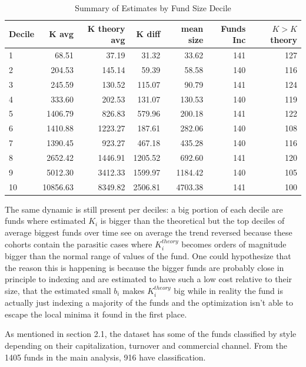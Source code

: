 \documentclass[12pt]{article}
\begin{document}
\begin{table}[H]
    \centering
    \caption{Summary of Estimates by Fund Size Decile}
    \label{tab:decile-estimates-new-3}
    \begin{tabular}{lrrrrrr}
        \hline
        Decile & K avg & K theory avg & K diff & mean size & Funds Inc & $K>K$ theory \\
        \hline
        1 & 68.51 & 37.19 & 31.32 & 33.62 & 141 & 127 \\
        2 & 204.53 & 145.14 & 59.39 & 58.58 & 140 & 116 \\
        3 & 245.59 & 130.52 & 115.07 & 90.79 & 141 & 124 \\
        4 & 333.60 & 202.53 & 131.07 & 130.53 & 140 & 119 \\
        5 & 1406.79 & 826.83 & 579.96 & 200.18 & 141 & 122 \\
        6 & 1410.88 & 1223.27 & 187.61 & 282.06 & 140 & 108 \\
        7 & 1390.45 & 923.27 & 467.18 & 435.28 & 140 & 116 \\
        8 & 2652.42 & 1446.91 & 1205.52 & 692.60 & 141 & 120 \\
        9 & 5012.30 & 3412.33 & 1599.97 & 1184.42 & 140 & 105 \\
        10 & 10856.63 & 8349.82 & 2506.81 & 4703.38 & 141 & 100 \\
        \hline
    \end{tabular}
\end{table}
The same dynamic is still present per deciles: a big portion of each decile are funds where estimated $K_i$ is bigger than the theoretical but the top deciles of average biggest funds over time see on average the trend reversed because these cohorts contain the parasitic cases where $K^{theory}_i$ becomes orders of magnitude bigger than the normal range of values of the fund.
One could hypothesize that the reason this is happening is because the bigger funds are probably close in principle to indexing and are estimated to have such a low cost relative to their size, that the estimated small $b_i$ makes $K^{theory}_i$ big while in reality the fund is actually just indexing a majority of the funds and the optimization isn't able to escape the local minima it found in the first place. 

\par As mentioned in section 2.1, the dataset has some of the funds classified by style depending on their capitalization, turnover and commercial channel. From the 1405 funds in the main analysis, 916 have classification. 
\end{document}
